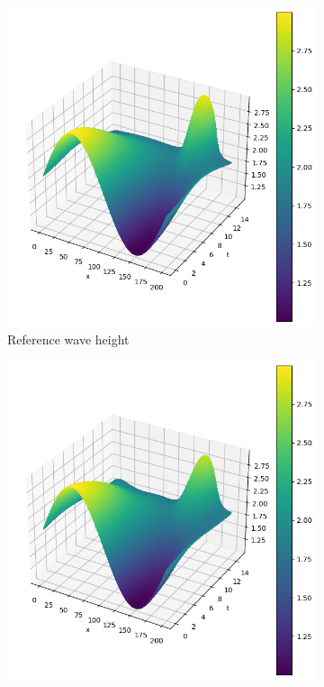 \begin{figure}[h]
    \centering
    \begin{subfigure}[b]{0.45\textwidth}
        \centering
        \includegraphics[width=\textwidth]{images/homogeneous_swe_pseudospectral_height.png}
        \caption{Reference wave height}
        \label{fig:homogeneous_pseudospectral_swe_height}
    \end{subfigure}
    \hfill
    \begin{subfigure}[b]{0.45\textwidth}
        \centering
        \includegraphics[width=\textwidth]{images/homogeneous_swe_pinn_height.png}

\end{subfigure}
\end{figure}
